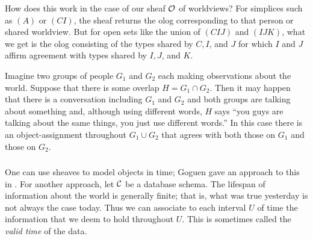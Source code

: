 \documentclass[CT4S-EN-RU]{subfiles}
\begin{document}
\begin{blockRUS}
\end{blockRUS}

\begin{blockENG}
How does this work in the case of our sheaf $\mathcal{O}$ of worldviews? For simplices such as $(A)$ or $(CI)$, the sheaf returns the olog corresponding to that person or shared worldview. But for open sets like the union of $(CIJ)$ and $(IJK)$, what we get is the olog consisting of the types shared by $C, I$, and $J$ for which $I$ and $J$ affirm agreement with types shared by $I, J$, and $K$.
\end{blockENG}

\begin{blockRUS}
\end{blockRUS}

\begin{exampleENG}
Imagine two groups of people $G_1$ and $G_2$ each making observations about the world. Suppose that there is some overlap $H=G_1\cap G_2$. Then it may happen that there is a conversation including $G_1$ and $G_2$ and both groups are talking about something and, although using different words, $H$ says “you guys are talking about the same things, you just use different words.” In this case there is an object-assignment throughout $G_1\cup G_2$ that agrees with both those on $G_1$ and those on $G_2$.
\end{exampleENG}

\begin{exampleRUS}
\end{exampleRUS}


\subsubsection{}

\begin{blockENG}
One can use sheaves to model objects in time; Goguen gave an approach to this in \cite{Gog}. For another approach, let $\mathcal{C}$ be a database schema. The lifespan of information about the world is generally finite; that is, what was true yesterday is not always the case today. Thus we can associate to each interval $U$ of time the information that we deem to hold throughout $U$. This is sometimes called the {\em valid time} of the data.
\end{blockENG}

\begin{blockRUS}
\end{blockRUS}
\end{document}
